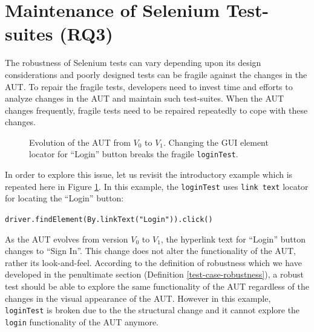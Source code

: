 

\section{Maintenance of Selenium Test-suites (RQ3)}
\label{locatorMaintenance}
The robustness of Selenium tests can vary depending upon its design considerations and poorly designed tests can be fragile against the changes in the AUT. To repair the fragile tests, developers need to invest time and efforts to analyze changes in the AUT and maintain such test-suites. When the AUT changes frequently, fragile tests need to be repaired repeatedly to cope with these changes. 

\begin{figure}[ht!]
\centering     %
{}
\vspace{-2mm}
  \captionsetup{justification=justified,
singlelinecheck=false}
\caption{Evolution of the AUT from $V_{0}$ to $V_{1}$. Changing the GUI element locator for ``Login'' button breaks the fragile \texttt{loginTest}.}
\label{fig:3loginTest}
\end{figure} 

In order to explore this issue, let us revisit the introductory example which is repeated here in Figure \ref{fig:3loginTest}. In this example, the \texttt{loginTest} uses \texttt{link text} locator for locating the ``Login'' button: \begin{small}
\texttt{driver.findElement(By.linkText("Login")).click()}\end{small}

As the AUT evolves from version $V_{0}$ to $V_{1}$, the hyperlink text for ``Login'' button changes to ``Sign In''. This change does not alter the functionality of the AUT, rather its look-and-feel. According to the definition of robustness which we have developed in the penultimate section (Definition \ref{test-case-robustness}), a robust test should be able to explore the same functionality of the AUT regardless of the changes in the visual appearance of the AUT. However in this example, \texttt{loginTest} is broken due to the the structural change and it cannot explore the \texttt{login} functionality of the AUT anymore. 

